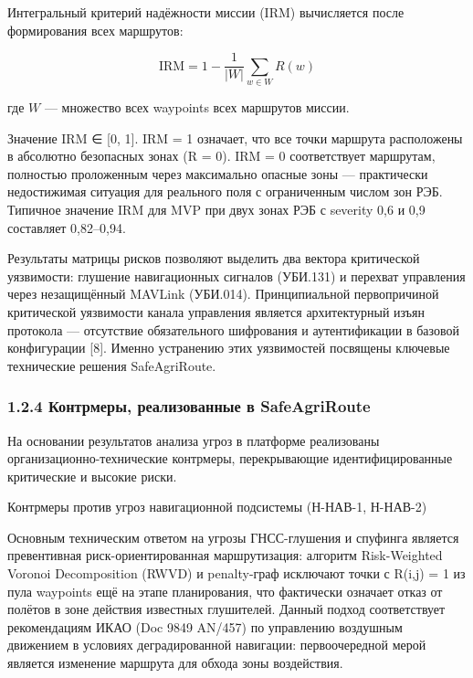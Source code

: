 \documentclass[14pt,a4paper]{extarticle}
\begin{document}
Интегральный критерий надёжности миссии (IRM) вычисляется после формирования всех маршрутов:

\[\mathrm{IRM} = 1 - \frac{1}{|W|}\sum_{w \in W} R(w)\]

где \(W\) --- множество всех waypoints всех маршрутов миссии.

Значение IRM ∈ {[}0, 1{]}. IRM = 1 означает, что все точки маршрута расположены в абсолютно безопасных зонах (R = 0). IRM = 0 соответствует маршрутам, полностью проложенным через максимально опасные зоны --- практически недостижимая ситуация для реального поля с ограниченным числом зон РЭБ. Типичное значение IRM для MVP при двух зонах РЭБ с severity 0,6 и 0,9 составляет 0,82--0,94.

Результаты матрицы рисков позволяют выделить два вектора критической уязвимости: глушение навигационных сигналов (УБИ.131) и перехват управления через незащищённый MAVLink (УБИ.014). Принципиальной первопричиной критической уязвимости канала управления является архитектурный изъян протокола --- отсутствие обязательного шифрования и аутентификации в базовой конфигурации {[}8{]}. Именно устранению этих уязвимостей посвящены ключевые технические решения SafeAgriRoute.

\hypertarget{ux43aux43eux43dux442ux440ux43cux435ux440ux44b-ux440ux435ux430ux43bux438ux437ux43eux432ux430ux43dux43dux44bux435-ux432-safeagriroute}{%
\subsubsection{1.2.4 Контрмеры, реализованные в SafeAgriRoute}\label{ux43aux43eux43dux442ux440ux43cux435ux440ux44b-ux440ux435ux430ux43bux438ux437ux43eux432ux430ux43dux43dux44bux435-ux432-safeagriroute}}

На основании результатов анализа угроз в платформе реализованы организационно-технические контрмеры, перекрывающие идентифицированные критические и высокие риски.

Контрмеры против угроз навигационной подсистемы (Н-НАВ-1, Н-НАВ-2)

Основным техническим ответом на угрозы ГНСС-глушения и спуфинга является превентивная риск-ориентированная маршрутизация: алгоритм Risk-Weighted Voronoi Decomposition (RWVD) и penalty-граф исключают точки с R(i,j) = 1 из пула waypoints ещё на этапе планирования, что фактически означает отказ от полётов в зоне действия известных глушителей. Данный подход соответствует рекомендациям ИКАО (Doc 9849 AN/457) по управлению воздушным движением в условиях деградированной навигации: первоочередной мерой является изменение маршрута для обхода зоны воздействия.
\end{document}
